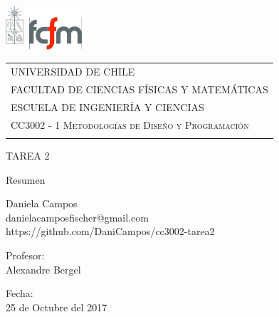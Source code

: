 \begin{titlepage}
  \includegraphics[width=3cm]{logo.png} 
	\hspace{0cm}
  \begin{tabular}{l}
   \small \scshape{UNIVERSIDAD DE CHILE} \\
 	\small \scshape{FACULTAD DE CIENCIAS FÍSICAS Y MATEMÁTICAS} \\
 	\small \scshape {ESCUELA DE INGENIERÍA Y CIENCIAS} \\
 	\small \scshape{CC3002 - 1 Metodologías de Diseño y Programación} \\
  \vspace*{0.5cm}\mbox{}
  \end{tabular}

\vspace*{3.5 cm}
  
\begin{center}
\fontsize{8mm}{9mm}\selectfont 
	TAREA 2
	
	Resumen

	\vspace*{0.8 cm}
  

\vspace*{3.5 cm}

	\normalsize{Daniela Campos} \\
	\normalsize{danielacamposfischer@gmail.com}\\
	\normalsize{https://github.com/DaniCampos/cc3002-tarea2}




	\vspace{0.5 cm}

	
	\footnotesize{Profesor:} \\
	\vspace{0.08 cm}
	\normalsize{Alexandre Bergel} \\
	
	\vspace{0.5 cm}

	

	\footnotesize{Fecha:} \\
	\vspace{0.08 cm}
	\normalsize{25 de Octubre del 2017} \\


\end{center}

\end{titlepage}

%